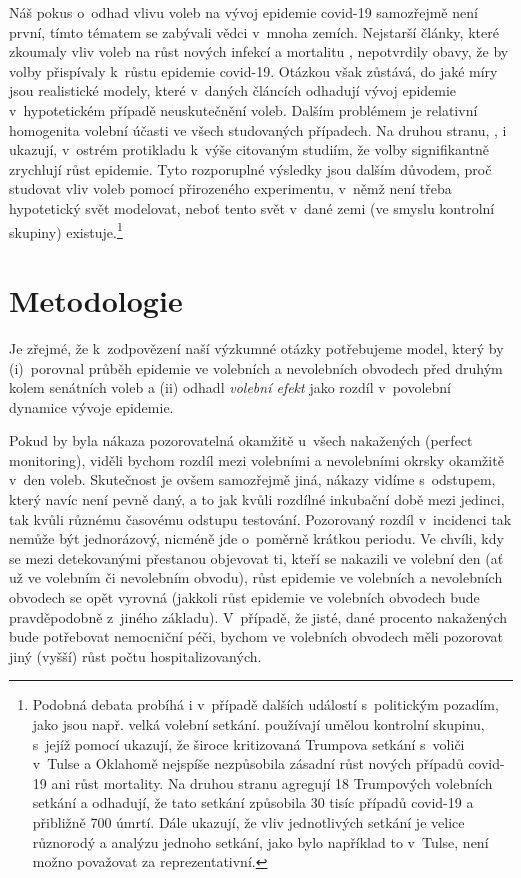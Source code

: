Náš pokus o~odhad vlivu voleb na vývoj epidemie covid-19 samozřejmě není první, tímto tématem se zabývali vědci v~mnoha zemích. Nejstarší články, které zkoumaly vliv voleb na růst nových infekcí a mortalitu \cite{Berry2020, feltham2020no, AJPH2020}, nepotvrdily obavy, že by volby přispívaly k~růstu epidemie covid-19. Otázkou však zůstává, do jaké míry jsou realistické modely, které v~daných článcích odhadují vývoj epidemie v~hypotetickém případě neuskutečnění voleb. Dalším problémem je relativní homogenita volební účasti ve všech studovaných případech. Na druhou stranu, 
\cite{bertoli_france}, \cite{cotti2020relationship} i \cite{Cassan2020} 
ukazují, v~ostrém protikladu k~výše citovaným studiím, že volby signifikantně zrychlují růst epidemie. Tyto rozporuplné výsledky jsou dalším důvodem, proč studovat vliv voleb pomocí přirozeného experimentu, v~němž není třeba hypotetický svět  modelovat, neboť tento svět v~dané zemi (ve smyslu kontrolní skupiny) existuje.\footnote{Podobná debata probíhá i v~případě dalších událostí s~politickým pozadím, jako jsou např. velká volební setkání. \cite{dave2020risk} používají umělou kontrolní skupinu, s~jejíž pomocí ukazují, že široce kritizovaná Trumpova setkání s~voliči v~Tulse a Oklahomě nejspíše nezpůsobila zásadní růst nových případů covid-19 ani růst mortality. Na druhou stranu  \cite{bernheim2020effects} agregují 18 Trumpových volebních setkání a odhadují, že tato setkání způsobila 30 tisíc případů covid-19 a přibližně 700 úmrtí. Dále  \cite{bernheim2020effects} ukazují, že vliv jednotlivých setkání je velice různorodý a analýzu jednoho setkání, jako bylo například to v~Tulse, není možno považovat za reprezentativní.}


\section*{Metodologie}
Je zřejmé, že k~zodpovězení naší výzkumné otázky potřebujeme model, který by (i)~porovnal průběh epidemie ve volebních a nevolebních obvodech před druhým kolem senátních voleb a (ii) odhadl {\it volební efekt} jako rozdíl v~povolební dynamice vývoje epidemie.

Pokud by byla nákaza pozorovatelná okamžitě u~všech nakažených (perfect monitoring), viděli bychom rozdíl mezi volebními a nevolebními okrsky okamžitě v~den voleb. Skutečnost je ovšem samozřejmě jiná, nákazy vidíme s~odstupem, který navíc není pevně daný, a to jak kvůli rozdílné inkubační době mezi jedinci, tak kvůli různému časovému odstupu testování. Pozorovaný rozdíl v~incidenci tak nemůže být jednorázový, nicméně jde o~poměrně krátkou periodu. Ve chvíli, kdy se mezi detekovanými přestanou objevovat ti, kteří se nakazili ve volební den (ať už ve volebním či nevolebním obvodu), růst epidemie ve volebních a nevolebních obvodech se opět vyrovná (jakkoli růst epidemie ve volebních obvodech bude pravděpodobně z~jiného základu). V~případě, že jisté, dané procento nakažených bude potřebovat nemocniční péči, bychom ve volebních obvodech měli pozorovat jiný (vyšší) růst počtu hospitalizovaných.  

